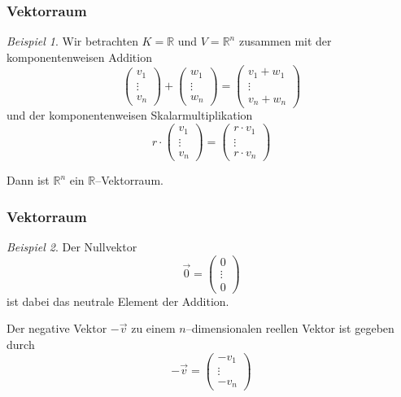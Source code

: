 \documentclass[hyperref={pdfpagelabels=false}]{beamer}
\theoremstyle{plain}%
\theoremstyle{definition}
\theoremstyle{remark}
\newtheorem*{beispiel}{Beispiel}
\def \R{\mathbb R}
\newcommand{\vektor}[1]{\overrightarrow{#1}}
\begin{document}
\begin{frame}
\frametitle{Vektorraum}

\begin{beispiel}
Wir betrachten $K = \R$ und $V = \R^n$ zusammen mit der komponentenweisen Addition \pause 
  	$$ \left( \begin{matrix} v_1 \\ \vdots \\ v_n 
     	\end{matrix} \right) + \left( \begin{matrix} w_1 \\ \vdots \\ w_n 
     	\end{matrix} \right) = \left( \begin{matrix} v_1 + w_1 \\ \vdots \\ 
     	v_n + w_n  \end{matrix} \right) $$ 
und der komponentenweisen Skalarmultiplikation \pause 
  	$$ r \cdot \left( \begin{matrix} v_1 \\ \vdots \\ v_n 
     	\end{matrix} \right) = \left( \begin{matrix} r \cdot v_1 \\ \vdots \\ 
     	r \cdot v_n \end{matrix} \right) $$

\pause 

\medbreak
Dann ist $\R^n$ ein $\R$--Vektorraum.  

\end{beispiel}

\end{frame}

\begin{frame}
\frametitle{Vektorraum}

\begin{beispiel}
Der Nullvektor 
	$$ \vektor{0} = \begin{pmatrix} 0 \\ \vdots \\ 0 \end{pmatrix} $$
ist dabei das neutrale Element der Addition. 

\pause
Der negative Vektor $- \vektor{v}$ zu 
einem $n$--dimensionalen reellen Vektor ist gegeben durch 
	$$ - \vektor{v} = \begin{pmatrix} -v_1 \\ \vdots \\ - v_n \end{pmatrix} $$
\end{beispiel}
\end{frame}
\end{document}
